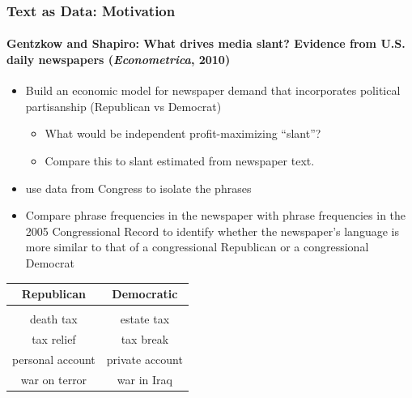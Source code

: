 \documentclass[
  shownotes,
  xcolor={svgnames},
  hyperref={colorlinks,citecolor=DarkBlue,linkcolor=DarkRed,urlcolor=DarkBlue}
  , aspectratio=169]{beamer}
\newcommand{\bk}{\color{black}}
\newcommand{\rd}{\color{red}}
\newcommand{\bl}{\color{blue}}
\begin{document}
\begin{frame}[fragile]
\frametitle{Text as Data: Motivation}
\framesubtitle{Gentzkow and Shapiro: What drives media slant?  Evidence from
U.S. daily newspapers ({\it Econometrica}, 2010)}

\begin{itemize}
\item Build an economic model for newspaper demand that incorporates political partisanship (\rd Republican \bk vs \bl Democrat\bk)


 
\begin{itemize}
\item What would be independent profit-maximizing ``slant''?
\item Compare this to slant estimated from newspaper text.
\end{itemize}


\item use data from Congress to isolate the phrases
\item Compare phrase frequencies in the newspaper with phrase frequencies in the 2005 Congressional Record to identify whether the newspaper’s language is more similar to that of a congressional Republican or a congressional Democrat

\end{itemize}
\begin{table}[H]
\begin{tabular}{cc}
{\rd Republican}       & {\bl Democratic}      \\
\hline \\
death tax        & estate tax      \\
tax relief       & tax break       \\
personal account & private account \\
war on terror    & war in Iraq    
\end{tabular}
\end{table}
\end{frame}

\end{document}
